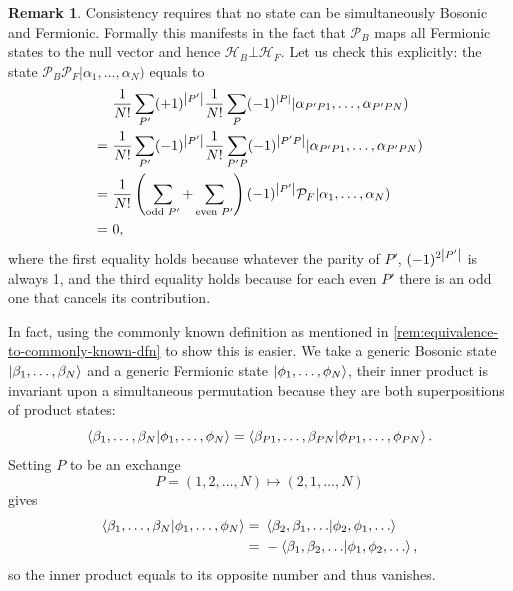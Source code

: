 \documentclass{article}
\theoremstyle{definition}
\newtheorem{rem}[mot]{Remark}
\numberwithin{equation}{section}
\begin{document}
\begin{rem}
    Consistency requires that no state can be simultaneously 
    Bosonic and Fermionic. 
    Formally this manifests in the fact that 
    $\mathcal{P}_{B}$ maps 
    all Fermionic states to the null vector and hence 
    $\mathcal{H}_{B} \bot \mathcal{H}_{F}$. 
    Let us check this explicitly: 
    the state
    $\mathcal{P}_{B} \mathcal{P}_{F}|\alpha_1, \ldots ,\alpha_{N})$ 
    equals to
    \begin{align*}
        &\ \frac{1}{N!}\sum_{P'}(+1)^{\abs{P'}}
        \frac{1}{N!}\sum_{P}(-1)^{\abs{P}}
        |\alpha_{P'P1}, \ldots ,\alpha_{P'PN}) \\
        =&\ 
        \frac{1}{N!}\sum_{P'}(-1)^{\abs{P'}}
        \frac{1}{N!}\sum_{P'P}(-1)^{\abs{P'P}}
        |\alpha_{P'P1}, \ldots ,\alpha_{P'PN})
        \\
        =&\ 
        \frac{1}{N!}
        \left( \sum_{\text{odd }P'}+\sum_{\text{even }P'} \right) 
        (-1)^{\abs{P'}}
        \mathcal{P}_{F} |\alpha_1, \ldots ,\alpha_{N})
        \\
        =&\ 
        0,
    \end{align*}
    where the first equality holds because 
    whatever the parity of $P'$, $(-1)^{2\abs{P'}}$ is always 1, and 
    the third equality holds because 
    for each even $P'$ there is an odd one that cancels its contribution. 

    In fact, using the commonly known definition 
    as mentioned in \cref{rem:equivalence-to-commonly-known-dfn} 
    to show this is easier. We take a generic Bosonic state 
    $\ket{\beta_1, \ldots ,\beta_{N}}$ and a generic Fermionic state 
    $\ket{\phi_{1}, \ldots ,\phi_{N}}$, their inner product 
    is invariant upon a simultaneous permutation 
    because they are both superpositions of product states: 
    \[
        \bra{\beta_1, \ldots ,\beta_{N}} 
        \ket{\phi_1, \ldots ,\phi_{N}}
        =
        \bra{\beta_{P 1}, \ldots ,\beta_{PN}}
        \ket{\phi_{P 1}, \ldots ,\phi_{PN}}.
    \]
    Setting $P$ to be an exchange 
    \[
        P = (1,2, \ldots ,N) \mapsto 
        (2,1, \ldots ,N)
    \]
    gives 
    \begin{align*}
        \bra{\beta_1, \ldots ,\beta_{N}} 
        \ket{\phi_1, \ldots ,\phi_{N}}
        =&\ 
        \bra{\beta_2,\beta_1, \ldots }
        \ket{\phi_2,\phi_1, \ldots } \\
        =&\ 
        - \bra{\beta_1,\beta_2, \ldots }
        \ket{\phi_1, \phi_2, \ldots },
    \end{align*}
    so the inner product equals to its 
    opposite number and thus vanishes.
\end{rem}
\end{document}
